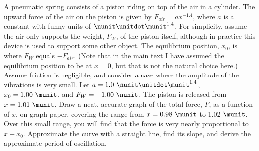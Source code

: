 A pneumatic spring consists of a piston riding on top
of the air in a cylinder. The upward force of the air on
the piston is given by $F_{air}=ax^{-1.4}$, where $a$ is a
constant with funny units of $\nunit\unitdot\munit^{1.4}$. For simplicity,
assume the air only supports the weight, $F_W$, of the
piston itself, although in practice this device is used to
support some other object. The equilibrium position, $x_0$,
is where $F_W$ equals $-F_{air}$. (Note that in the main
text I have assumed the equilibrium position to be at $x=0$,
but that is not the natural choice here.) Assume friction
is negligible, and consider a case where the amplitude of
the vibrations is very small. Let $a=1.0\ \nunit\unitdot\munit^{1.4}$, 
$x_0=1.00\ \munit$, and $F_W=-1.00\ \nunit$. The piston is released from
$x=1.01\ \munit$. Draw a neat, accurate graph of the total
force, $F$, as a function of $x$, on graph paper, covering
the range from $x=0.98\ \munit$ to 1.02 $\munit$. Over this small
range, you will find that the force is very nearly
proportional to $x-x_0$. Approximate the curve with a
straight line, find its slope, and derive the approximate
period of oscillation. \answercheck
